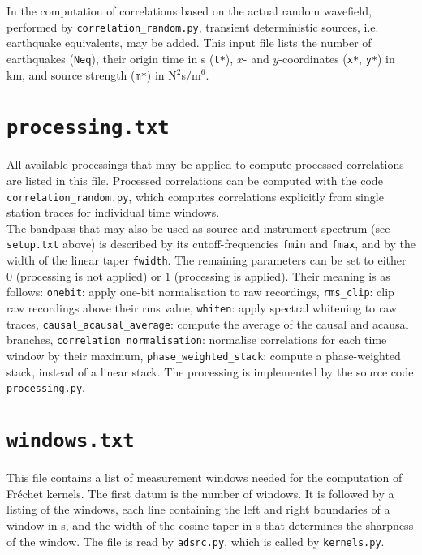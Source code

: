 In the computation of correlations based on the actual random wavefield, performed by \texttt{correlation\_random.py}, transient deterministic sources, i.e. earthquake equivalents, may be added. This input file lists the number of earthquakes (\texttt{Neq}), their origin time in s (\texttt{t*}), $x$- and $y$-coordinates (\texttt{x*}, \texttt{y*}) in km, and source strength (\texttt{m*}) in N$^2$s$/$m$^6$. 

\section{\texttt{processing.txt}}

All available processings that may be applied to compute processed correlations are listed in this file. Processed correlations can be computed with the code \texttt{correlation\_random.py}, which computes correlations explicitly from single station traces for individual time windows.\\[5pt]
%
The bandpass that may also be used as source and instrument spectrum (see \texttt{setup.txt} above) is described by its cutoff-frequencies \texttt{fmin} and \texttt{fmax}, and by the width of the linear taper \texttt{fwidth}. The remaining parameters can be set to either $0$ (processing is not applied) or $1$ (processing is applied). Their meaning is as follows: \texttt{onebit}: apply one-bit normalisation to raw recordings, \texttt{rms\_clip}: clip raw recordings above their rms value, \texttt{whiten}: apply spectral whitening to raw traces, \texttt{causal\_acausal\_average}: compute the average of the causal and acausal branches, \texttt{correlation\_normalisation}: normalise correlations for each time window by their maximum, \texttt{phase\_weighted\_stack}: compute a phase-weighted stack, instead of a linear stack. The processing is implemented by the source code \texttt{processing.py}.

\section{\texttt{windows.txt}}

This file contains a list of measurement windows needed for the computation of Fr\'{e}chet kernels. The first datum is the number of windows. It is followed by a listing of the windows, each line containing the left and right boundaries of a window in s, and the width of the cosine taper in s that determines the sharpness of the window. The file is read by \texttt{adsrc.py}, which is called by \texttt{kernels.py}. 

